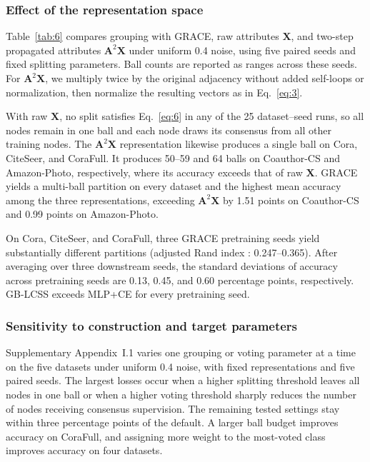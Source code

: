 \documentclass[times,review,10pt]{elsarticle}
\theoremstyle{definition}
\theoremstyle{plain}
\begin{document}
\subsubsection{Effect of the representation space}\label{sec:4.3.3}

Table~\ref{tab:6} compares grouping with GRACE, raw attributes \(\mathbf X\), and two-step propagated attributes \(\mathbf A^2\mathbf X\) under uniform 0.4 noise, using five paired seeds and fixed splitting parameters. Ball counts are reported as ranges across these seeds. For \(\mathbf A^2\mathbf X\), we multiply twice by the original adjacency without added self-loops or normalization, then normalize the resulting vectors as in Eq.~\eqref{eq:3}.



With raw \(\mathbf{X}\), no split satisfies Eq.~\eqref{eq:6} in any of the 25 dataset--seed runs, so all nodes remain in one ball and each node draws its consensus from all other training nodes. The \(\mathbf{A}^2\mathbf{X}\) representation likewise produces a single ball on Cora, CiteSeer, and CoraFull. It produces 50--59 and 64 balls on Coauthor-CS and Amazon-Photo, respectively, where its accuracy exceeds that of raw \(\mathbf{X}\). GRACE yields a multi-ball partition on every dataset and the highest mean accuracy among the three representations, exceeding \(\mathbf{A}^2\mathbf{X}\) by 1.51 points on Coauthor-CS and 0.99 points on Amazon-Photo. 

On Cora, CiteSeer, and CoraFull, three GRACE pretraining seeds yield substantially different partitions (adjusted Rand index \cite{ref74}: 0.247--0.365). After averaging over three downstream seeds, the standard deviations of accuracy across pretraining seeds are 0.13, 0.45, and 0.60 percentage points, respectively. GB-LCSS exceeds MLP+CE for every pretraining seed.

\subsubsection{Sensitivity to construction and target parameters}\label{sec:4.3.4}

Supplementary Appendix~I.1 varies one grouping or voting parameter at a time on the five datasets under uniform 0.4 noise, with fixed representations and five paired seeds. The largest losses occur when a higher splitting threshold leaves all nodes in one ball or when a higher voting threshold sharply reduces the number of nodes receiving consensus supervision. The remaining tested settings stay within three percentage points of the default. A larger ball budget improves accuracy on CoraFull, and assigning more weight to the most-voted class improves accuracy on four datasets.
\end{document}
